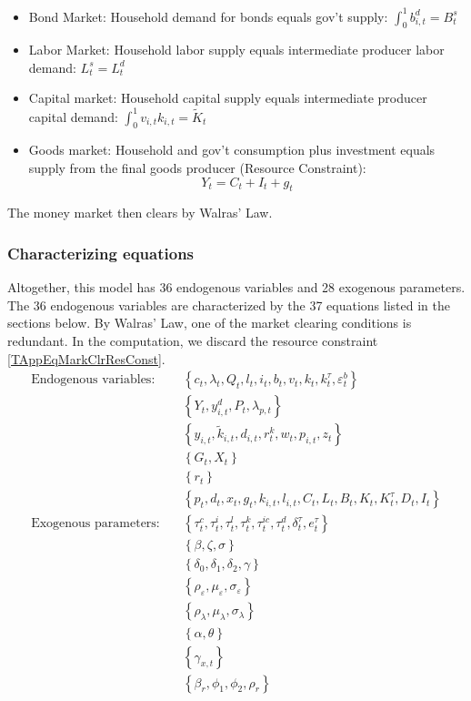 \documentclass[article,11pt,letterpaper,fleqn]{article}
\theoremstyle{definition}
\numberwithin{equation}{section}
\newcommand\ve{\varepsilon}
\begin{document}
\begin{itemize}
\item Bond Market: Household demand for bonds equals gov't supply: $\int_{0}^{1}b^{d}_{i,t}=B^{s}_{t}$ 
\item Labor Market: Household labor supply equals intermediate producer labor demand: $L^{s}_{t} = L^{d}_{t}$
\item Capital market: Household capital supply equals intermediate producer capital demand: $\int_{0}^{1} v_{i,t}k_{i,t} = \tilde{K}_{t}$
\item Goods market: Household and gov't consumption plus investment equals supply from the final goods producer (Resource Constraint): 
\begin{equation}
\label{Resource}
Y_{t} = C_{t} + I_{t} + g_{t}  
\end{equation}
\end{itemize}

The money market then clears by Walras' Law.


\subsubsection{Characterizing equations}
\label{TAppCharEqs}

Altogether, this model has 36 endogenous variables and 28 exogenous parameters. The 36 endogenous variables are characterized by the 37 equations listed in the sections below. By Walras' Law, one of the market clearing conditions is redundant. In the computation, we discard the resource constraint \eqref{TAppEqMarkClrResConst}.
\begin{align*}
   \text{Endogenous variables:}\quad &\left\{c_t,\lambda_t,Q_{t},l_t,i_t,b_t,v_t,k_t,k_t^\tau,\ve_t^b\right\} \\
   &\left\{Y_t,y_{i,t}^d,P_t,\lambda_{p,t}\right\} \\
   &\left\{y_{i,t},\tilde{k}_{i,t},d_{i,t},r_t^k,w_t,p_{i,t},z_t\right\} \\
   &\left\{G_t,X_t\right\} \\
   &\left\{r_t\right\} \\
   &\left\{p_t,d_t,x_t,g_t,k_{i,t},l_{i,t},C_t,L_t,B_t,K_t,K_t^\tau,D_t,I_t\right\} \\
   \text{Exogenous parameters:}\quad &\left\{\tau_t^c,\tau_t^i,\tau_t^l,\tau_t^k,\tau_t^{ic},\tau_t^d,\delta_t^\tau,e_t^\tau\right\} \\
   &\left\{\beta,\zeta,\sigma\right\} \\
   &\left\{\delta_0,\delta_1,\delta_2,\gamma\right\} \\
   &\left\{\rho_\ve,\mu_\ve,\sigma_\ve\right\} \\
   &\left\{\rho_\lambda,\mu_\lambda,\sigma_\lambda\right\} \\
   &\left\{\alpha,\theta\right\} \\
   &\left\{\gamma_{x,t}\right\} \\
   &\left\{\beta_r,\phi_1,\phi_2,\rho_r\right\}
\end{align*}
\end{document}

